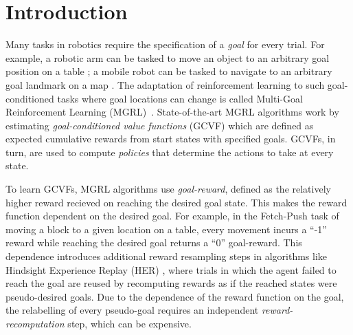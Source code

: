\section{Introduction}

Many tasks in robotics require the specification of a \emph{goal} for every
trial. For example, a robotic arm can be tasked to move an object to an arbitrary
goal position on a table \citep{gu2017deep}; a mobile robot can be
tasked to navigate to an arbitrary goal landmark on a map \citep{zhu2017target}. The
adaptation of reinforcement learning to such goal-conditioned tasks where goal
locations can change is called Multi-Goal Reinforcement Learning
(MGRL)~\citep{plappert2018multi}.
State-of-the-art MGRL algorithms
\citep{andrychowicz2017hindsight, pong2018temporal}
work by estimating \emph{goal-conditioned value functions} (GCVF) which
are defined as expected cumulative rewards from 
start states with specified goals. GCVFs, in turn, are used to compute
\emph{policies} that determine the actions to take at every state.


To learn GCVFs, MGRL algorithms use \emph{goal-reward},
defined as the relatively higher reward recieved on reaching the desired
goal state.
This makes the reward function dependent on the desired goal.
For example, in the Fetch-Push task \citep{plappert2018multi} of moving
a block to a given location on a table, every movement incurs a ``-1''
reward while reaching the desired goal returns a ``0'' goal-reward. 
This dependence introduces additional reward resampling steps in
algorithms like Hindsight Experience Replay (HER)
\citep{andrychowicz2017hindsight}, where
trials in which the agent failed to reach the goal are reused by recomputing
rewards as if the reached states were pseudo-desired goals.
Due to the dependence of the reward function on the goal,
the relabelling of every pseudo-goal requires an independent
\emph{reward-recomputation} step, which can be expensive. 


